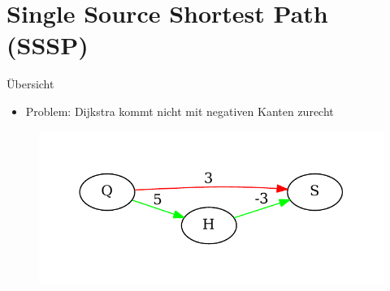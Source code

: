 \section{Single Source Shortest Path (SSSP)}

\begin{frame}{Übersicht}

\begin{itemize}
\itemsep1pt\parskip0pt
\item
  Problem: Dijkstra kommt nicht mit negativen Kanten zurecht
\end{itemize}

\begin{figure}[htbp]
\centering
\includegraphics[width=\linewidth]{dijkstra_gegenbeispiel.pdf}
\end{figure}

\end{frame}

